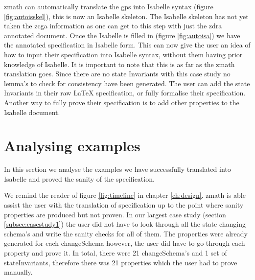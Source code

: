 \Gls{zmath} can automatically translate the \gls{gps} into Isabelle syntax
(figure \ref{fig:autoisskel}), this is now an Isabelle skeleton. The Isabelle
skeleton has not yet taken the \gls{zcga} information as one can get to this
step with just the \gls{zdra} annotated document. Once the Isabelle is filled in
(figure \ref{fig:autoisa}) we have the annotated specification in Isabelle form.
This can now give the user an idea of how to input their specification into
Isabelle syntax, without them having prior knowledge of Isabelle. It is
important to note that this is as far as the \gls{zmath} translation goes. Since
there are no state Invariants with this case study no lemma's to check for
consistency have been generated. The user can add the state Invariants in their
raw \LaTeX{} specification, or fully formalise their specification. Another way
to fully prove their specification is to add other properties to the Isabelle
document.

\section{Analysing examples}

In this section we analyse the examples we have successfully translated into
Isabelle and proved the sanity of the specification. 


We remind the reader of figure \ref{fig:timeline} in chapter \ref{ch:design}.
\Gls{zmath} is able assist the user with the translation of specification up to
the point where sanity properties are produced but not proven. In our largest
case study (section \ref{subsec:casestudy1}) the user did not have to look
through all the state changing schema's and write the sanity checks for all of
them. The properties were already generated for each changeSchema however, the
user did have to go through each property and prove it. In total, there were 21
changeSchema's and 1 set of stateInvariants, therefore there was 21 properties
which the user had to prove manually.




